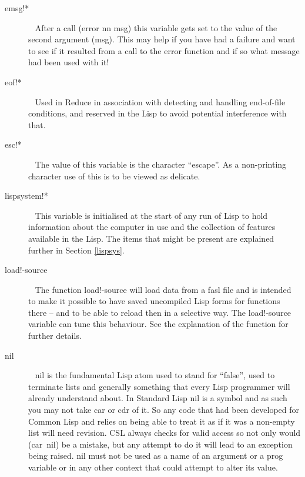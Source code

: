 \documentclass[a4paper,11pt]{article}
\begin{document}
\begin{description}
\item [{\ttfamily emsg!*}]  ~\newline
After a call {\ttfamily (error nn msg)} this variable gets set to the
value of the second argument ({\ttfamily msg}). This may help if you have had
a failure and want to see if it resulted from a call to the {\ttfamily error}
function and if so what message had been used with it!

\item [{\ttfamily eof!*}]  ~\newline
Used in Reduce in association with detecting and handling end-of-file
conditions, and reserved in the Lisp to avoid potential interference with
that.

\item [{\ttfamily esc!*}]  ~\newline
The value of this variable is the character ``escape''. As a non-printing
character use of this is to be viewed as delicate.

\item [{\ttfamily lispsystem!*}]  ~\newline
This variable is initialised at the start of any run of Lisp to hold
information about the computer in use and the collection of features
available in the Lisp. The items that might be present are explained
further in Section \ref{lispsys}.

\item [{\ttfamily load!-source}]  ~\newline
The function {\ttfamily load!-source} will load data from a fasl file
and is intended to make it possible to have saved uncompiled Lisp forms
for functions there -- and to be able to reload then in a selective
way. The {\ttfamily load!-source} variable can tune this behaviour. See the
explanation of the function for further details.

\item [{\ttfamily nil}]  ~\newline
{\ttfamily nil} is the fundamental Lisp atom used to stand for ``false'',
used to terminate lists and generally something that every Lisp programmer
will already understand about. In Standard Lisp {\ttfamily nil} is a
symbol and as such you may not take {\ttfamily car} or {\ttfamily cdr} of
it. So any code that had been developed for Common Lisp and relies on being
able to treat it as if it was a non-empty list will need revision. CSL
always checks for valid access so not only would {\ttfamily (car~nil)} be
a mistake,  but any attempt to do it will lead to an exception being
raised. {\ttfamily nil} must not be used as a name of an argument or a
{\ttfamily prog} variable or in any other context that could attempt to
alter its value.


\end{description}
\end{document}
